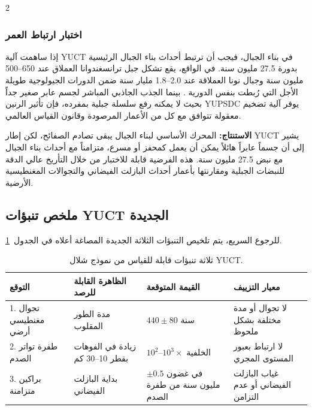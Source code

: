 \documentclass[11pt,a4paper]{article}
\begin{document}
\begin{multicols}{2}
		\subsubsection{اختبار ارتباط العمر}
		إذا ساهمت آلية YUCT في بناء الجبال، فيجب أن ترتبط أحداث بناء الجبال الرئيسية بدورة 27.5 مليون سنة. في الواقع، يقع تشكل جبل ترانسغندوانا العملاق عند 650–500 مليون سنة وجبال نونا العملاقة عند 2.0–1.8 مليار سنة \cite{CampbellAllen2008} ضمن الدورات الجيولوجية طويلة الأجل التي رُبطت بنفس الدورية \cite{Rampino2021}. بينما الجذب الجاذبي المباشر لجسم عابر صغير جداً بحيث لا يمكنه رفع سلسلة جبلية بمفرده، فإن تأثير الرنين YUPSDC يوفر آلية تضخيم معقولة تتوافق مع كل من الأعمار المرصودة وقانون القياس العالمي.
		
		\vspace{0.3cm}
		\noindent
		\textbf{الاستنتاج:} المحرك الأساسي لبناء الجبال يبقى تصادم الصفائح، لكن إطار YUCT يشير إلى أن جسماً عابراً هائلاً يمكن أن يعمل كمحفز أو مسرع، متزامناً مع أحداث بناء الجبال مع نبض 27.5 مليون سنة. هذه الفرضية قابلة للاختبار من خلال التأريخ عالي الدقة للنبضات الجبلية ومقارنتها بأعمار أحداث البازلت الفيضاني والتجوالات المغنطيسية الأرضية.
		
	\end{multicols}
	
	\subsection{ملخص تنبؤات YUCT الجديدة}
	للرجوع السريع، يتم تلخيص التنبؤات الثلاثة الجديدة المصاغة أعلاه في الجدول~\ref{tab:new_predictions}.
	
	\begin{table}[H]
		\centering
		\small
		\caption{ثلاثة تنبؤات قابلة للقياس من نموذج شلال YUCT.}
		\label{tab:new_predictions}
		\begin{tabular}{p{3.9cm} p{4.4cm} p{4.7cm} p{4.0cm}}
			\toprule
			\textbf{التوقع} & \textbf{الظاهرة القابلة للرصد} & \textbf{القيمة المتوقعة} & \textbf{معيار التزييف} \\
			\midrule
			1. تجوال مغنطيسي أرضي & مدة الطور المقلوب & \(440 \pm 80\) سنة & لا تجوال أو مدة مختلفة بشكل ملحوظ \\
			2. طفرة تواتر الصدم & زيادة في الفوهات بقطر 10–30 كم & \(10^{2}\)–\(10^{3}\times\) الخلفية & لا ارتباط بعبور المستوى المجري \\
			3. براكين متزامنة & بداية البازلت الفيضاني & في غضون \(\pm 0.5\) مليون سنة من طفرة الصدم & غياب البازلت الفيضاني أو عدم التزامن \\
			\bottomrule
		\end{tabular}
	\end{table}
	
\end{document}
